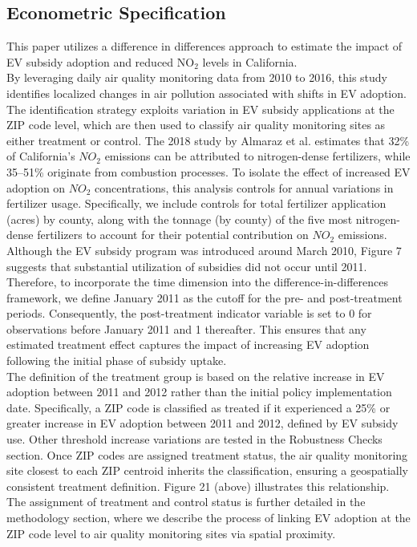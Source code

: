 \documentclass[12pt]{article}
\newcommand\tab[1][.50cm]{\hspace*{#1}}
\begin{document}
	\begin{multicols}{2}
		
		\section*{Econometric Specification}
		
		This paper utilizes a difference in differences approach to estimate the impact of EV subsidy adoption and reduced $\text{NO}_\text{2}$ levels in California.\\
		\tab By leveraging daily air quality monitoring data from 2010 to 2016, this study identifies localized changes in air pollution associated with shifts in EV adoption. The identification strategy exploits variation in EV subsidy applications at the ZIP code level, which are then used to classify air quality monitoring sites as either treatment or control. The 2018 study by Almaraz et al. estimates that 32\% of California's $NO_2$ emissions can be attributed to nitrogen-dense fertilizers, while 35–51\% originate from combustion processes. To isolate the effect of increased EV adoption on $NO_2$ concentrations, this analysis controls for annual variations in fertilizer usage. Specifically, we include controls for total fertilizer application (acres) by county, along with the tonnage (by county) of the five most nitrogen-dense fertilizers to account for their potential contribution on $NO_2$ emissions. \\
		\tab Although the EV subsidy program was introduced around March 2010, Figure 7 suggests that substantial utilization of subsidies did not occur until 2011. Therefore, to incorporate the time dimension into the difference-in-differences framework, we define January 2011 as the cutoff for the pre- and post-treatment periods. Consequently, the post-treatment indicator variable is set to 0 for observations before January 2011 and 1 thereafter. This ensures that any estimated treatment effect captures the impact of increasing EV adoption following the initial phase of subsidy uptake.\\
		\tab The definition of the treatment group is based on the relative increase in EV adoption between 2011 and 2012 rather than the initial policy implementation date. Specifically, a ZIP code is classified as treated if it experienced a 25\% or greater increase in EV adoption between 2011 and 2012, defined by EV subsidy use. Other threshold increase variations are tested in the Robustness Checks section. Once ZIP codes are assigned treatment status, the air quality monitoring site closest to each ZIP centroid inherits the classification, ensuring a geospatially consistent treatment definition. Figure 21 (above) illustrates this relationship. The assignment of treatment and control status is further detailed in the methodology section, where we describe the process of linking EV adoption at the ZIP code level to air quality monitoring sites via spatial proximity.\\

\end{multicols}
\end{document}
